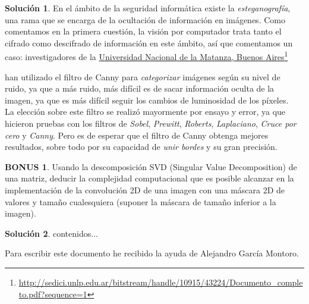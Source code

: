 \documentclass[a4paper, 11pt]{article}
\newcommand\fnurl[2]{%
  \href{#2}{#1}\footnote{\url{#2}}%
}
\theoremstyle{definition}
\newtheorem*{solucion}{Solución}
\newtheorem*{bonus}{BONUS}
\begin{document}
  \begin{solucion}
     	En el ámbito de la seguridad informática existe la \textit{esteganografía},
      una rama que se encarga de la ocultación de información en imágenes. Como
      comentamos en la primera cuestión, la visión por computador trata tanto el
      cifrado como descifrado de información en este ámbito, así que comentamos un
      caso: investigadores de la
      \fnurl{Universidad Nacional de la Matanza, Buenos Aires}{http://sedici.unlp.edu.ar/bitstream/handle/10915/43224/Documento_completo.pdf?sequence=1}
      han utilizado el filtro de Canny para \textit{categorizar} imágenes según
      su nivel de ruido, ya que a más ruido, más difícil es de sacar información
      oculta de la imagen, ya que es más difícil seguir los cambios de luminosidad
      de los píxeles. \\

      La elección sobre este filtro se realizó mayormente por ensayo y error,
      ya que hicieron pruebas con los filtros de \textit{Sobel}, \textit{Prewitt},
      \textit{Roberts}, \textit{Laplaciano}, \textit{Cruce por cero} y \textit{Canny}.
      Pero es de esperar que el filtro de Canny obtenga mejores resultados, sobre
      todo por su capacidad de \textit{unir bordes} y su gran precisión.
  \end{solucion}
  \begin{bonus}
     	Usando la descomposición SVD (Singular Value
      Decomposition) de una matriz, deducir la complejidad computacional que es
      posible alcanzar en la implementación de la convolución 2D de una imagen
      con una máscara 2D de valores y tamaño cualesquiera (suponer la máscara de
      tamaño inferior a la imagen).

  \end{bonus}

  \begin{solucion}
     	contenidos...
  \end{solucion}

  Para escribir este documento he recibido la ayuda de Alejandro García Montoro.
\end{document}
